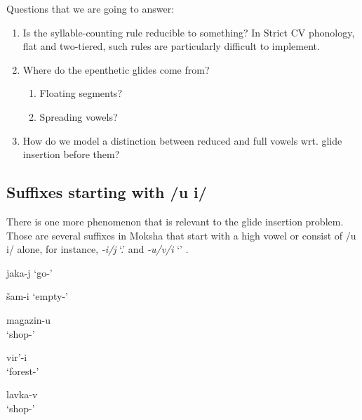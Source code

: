 \documentclass[a4paper, 12pt]{article}
\begin{document}
	\noindent Questions that we are going to answer:
	
	\begin{enumerate}[$\gg$]
		\item Is the syllable-counting rule reducible to something? In Strict CV phonology, flat and two-tiered, such rules are particularly difficult to implement.
		\item Where do the epenthetic glides come from?
			\begin{enumerate}[$\cdot$]
			\setlength\itemsep{0em}
				\item Floating segments?
				\item Spreading vowels?
			\end{enumerate}
		\item How do we model a distinction between reduced and full vowels wrt. glide insertion before them?
	\end{enumerate}
			
			\subsection{Suffixes starting with /u i/}
			
	There is one more phenomenon that is relevant to the glide insertion problem. Those are several suffixes in Moksha that start with a high vowel or consist of /u i/ alone, for instance, \emph{-i/j} `{\Npst}.{\Tsg}' and \emph{-u/v/i} `{\Lat}' \parencite{kozlov2018}.
	
\begin{minipage}[t]{.3\linewidth}
\ex\label{ex:jakaj}
	jaka-j `go-{\Tsg}' 
\xe
\end{minipage}
\hfill
\begin{minipage}[t]{.3\linewidth}
\ex\label{ex:shami}
	šam-i `empty-{\Tsg}' 
\xe
\end{minipage}	
	
\begin{minipage}[t]{.3\linewidth}
\ex\label{ex:mag}
	magazin-u \\`shop-{\Lat}'
\xe
\end{minipage}
\hfill
\begin{minipage}[t]{.3\linewidth}
\ex\label{ex:viri}
	vir'-i \\`forest-{\Lat}'
\xe
\end{minipage}	
\hfill
\begin{minipage}[t]{.3\linewidth}
\ex\label{ex:lavkav}
	lavka-v \\`shop-{\Lat}'
\xe
\end{minipage}
\end{document}
